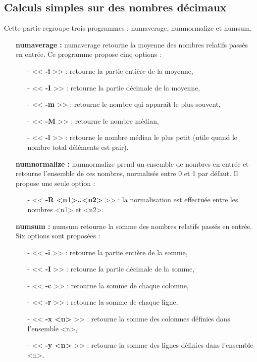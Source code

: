 \subsection{Calculs simples sur des nombres d\'ecimaux}

Cette partie regroupe trois programmes : numaverage, numnormalize et numsum.
\newline
\begin{itemize}
 \item[\textbullet] \textbf{numaverage :} numaverage retourne la moyenne des nombres relatifs pass\'es en entr\'ee.
Ce programme propose cinq options :
\begin{itemize}
  \item[-] << \textbf{-i} >> : retourne la partie enti\`ere de la moyenne,
  \item[-] << \textbf{-I} >> : retourne la partie d\'ecimale de la moyenne,
  \item[-] << \textbf{-m} >> : retourne le nombre qui appara\^it le plus souvent,
  \item[-] << \textbf{-M} >> : retourne le nombre m\'edian,
  \item[-] << \textbf{-l} >> : retourne le nombre m\'edian le plus petit (utile quand le nombre total d\'el\'ements est pair).
\newline
\end{itemize}
\item[\textbullet] \textbf{numnormalize :} numnormalize prend un ensemble de nombres en entr\'ee et retourne l'ensemble de ces nombres, 
normalis\'es entre 0 et 1 par d\'efaut. Il propose une seule option :
\begin{itemize}
 \item[-] << \textbf{-R <n1>..<n2>} >> : la normalisation est effectu\'ee entre les nombres <n1> et <n2>.
\newline
\end{itemize}
 \item[\textbullet] \textbf{numsum :} numsum retourne la somme des nombres relatifs pass\'es en entr\'ee.
Six options sont propos\'ees :
\begin{itemize}
 \item[-] << \textbf{-i} >> : retourne la partie enti\`ere de la somme,
 \item[-] << \textbf{-I} >> : retourne la partie d\'ecimale de la somme,
 \item[-] << \textbf{-c} >> : retourne la somme de chaque colomne,
 \item[-] << \textbf{-r} >> : retourne la somme de chaque ligne,
 \item[-] << \textbf{-x <n>} >> : retourne la somme des colomnes d\'efinies dans l'ensemble <n>,
 \item[-] << \textbf{-y <n>} >> : retourne la somme des lignes d\'efinies dans l'ensemble <n>.
\end{itemize}
\end{itemize}

